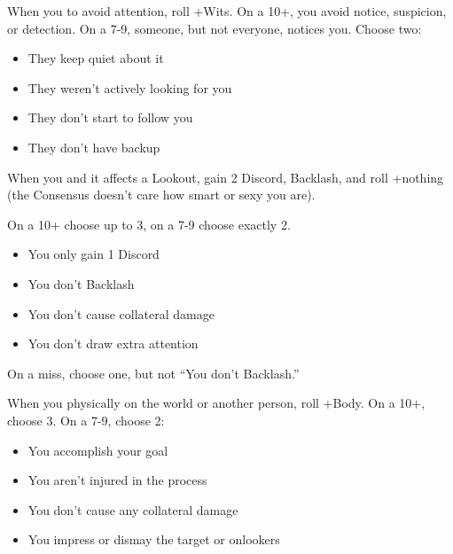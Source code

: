 \begin{multicols}{3}
  \begin{move}
    When you  to avoid attention, roll
    +Wits. On a 10+, you avoid notice, suspicion, or detection. On a
    7-9, someone, but not everyone, notices you. Choose two:
    \begin{itemize}
      \setlength\itemsep{0em}
    \item They keep quiet about it
    \item They weren't actively looking for you
    \item They don't start to follow you
    \item They don't have backup
    \end{itemize}
  \end{move}

  \SEPARATOR

  \begin{move}
    When you  and it affects a Lookout, gain
    2 Discord, Backlash, and roll +nothing (the Consensus doesn't care
    how smart or sexy you are).

    On a 10+ choose up to 3, on a 7-9 choose exactly 2.
    \begin{itemize}
      \setlength\itemsep{0em}
    \item You only gain 1 Discord
    \item You don't Backlash
    \item You don't cause collateral damage
    \item You don't draw extra attention
    \end{itemize}
    On a miss, choose one, but not ``You don't Backlash.''
  \end{move}

  \columnbreak
  
  \begin{move}
    When you  physically on the world or another
    person, roll +Body. On a 10+, choose 3. On a 7-9, choose 2:
    \begin{itemize}
      \setlength\itemsep{0em}
    \item You accomplish your goal
    \item You aren't injured in the process
    \item You don't cause any collateral damage
    \item You impress or dismay the target or onlookers
    \end{itemize}
  \end{move}


\end{multicols}
